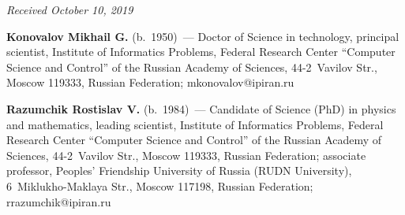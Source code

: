 
\hfill{\small\textit{Received October 10, 2019}}



   \Contr
   
   \noindent
   \textbf{Konovalov Mikhail G.} (b.\ 1950)~--- Doctor of Science in technology, 
principal scientist, Institute of Informatics Problems, Federal Research Center 
``Computer Science and Control'' of the Russian Academy of Sciences, 44-2~Vavilov 
Str., Moscow 119333, Russian Federation; \mbox{mkonovalov@ipiran.ru}
   
   \vspace*{6pt}
   
   \noindent
   \textbf{Razumchik Rostislav V.} (b.\ 1984)~--- Candidate of Science (PhD) in 
physics and mathematics, leading scientist, Institute of Informatics Problems, Federal 
Research Center ``Computer Science and Control'' of the Russian Academy of 
Sciences, 44-2~Vavilov Str., Moscow 119333, Russian Federation; associate 
professor, Peoples' Friendship University of Russia (RUDN University), 
6~Miklukho-Maklaya Str., Moscow 117198, Russian Federation; 
\mbox{rrazumchik@ipiran.ru} 
\label{end\stat}

\renewcommand{\bibname}{\protect\rm Литература}  